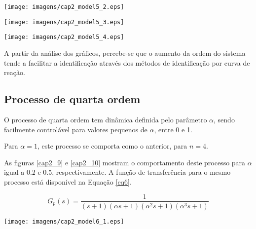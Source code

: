     \begin{center}
        \texttt{[image: imagens/cap2\_model5\_2.eps]}
        \label{cap2_6}
    \end{center}
    
    \begin{center}
        \texttt{[image: imagens/cap2\_model5\_3.eps]}
        \label{cap2_7}
    \end{center}
    
    \begin{center}
        \texttt{[image: imagens/cap2\_model5\_4.eps]}
        \label{cap2_8}
    \end{center}

    A partir da análise dos gráficos, percebe-se que o aumento da ordem do sistema
    tende a facilitar a identificação através dos métodos de identificação por
    curva de reação.
    
\subsection{Processo de quarta ordem}
    
    O processo de quarta ordem tem dinâmica definida pelo parâmetro $\alpha$,
    sendo facilmente controlável para valores pequenos de $\alpha$, entre 0 e 1.
    
    Para $\alpha = 1$, este processo se comporta como o anterior, para $n = 4$.
    
    As figuras \ref{cap2_9} e \ref{cap2_10} mostram o comportamento deste
    processo para $\alpha$ igual a 0.2 e 0.5, respectivamente. A função de
    transferência para o mesmo processo está disponível na Equação \ref{eq6}.
    
    \begin{equation}
        \label{eq6}
        G_p(s) = \frac{1}{(s+1)(\alpha s+1)(\alpha ^2 s+1)(\alpha ^3 s+1)}
    \end{equation}

    \begin{center}
        \texttt{[image: imagens/cap2\_model6\_1.eps]}
        \label{cap2_9}
    \end{center}
    
